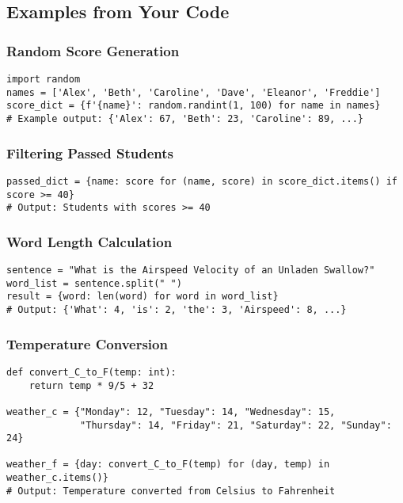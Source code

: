\documentclass[12pt,a4paper]{article}
\begin{document}
\subsection{Examples from Your Code}

\subsubsection{Random Score Generation}
\begin{lstlisting}
import random
names = ['Alex', 'Beth', 'Caroline', 'Dave', 'Eleanor', 'Freddie']
score_dict = {f'{name}': random.randint(1, 100) for name in names}
# Example output: {'Alex': 67, 'Beth': 23, 'Caroline': 89, ...}
\end{lstlisting}

\subsubsection{Filtering Passed Students}
\begin{lstlisting}
passed_dict = {name: score for (name, score) in score_dict.items() if score >= 40}
# Output: Students with scores >= 40
\end{lstlisting}

\subsubsection{Word Length Calculation}
\begin{lstlisting}
sentence = "What is the Airspeed Velocity of an Unladen Swallow?"
word_list = sentence.split(" ")
result = {word: len(word) for word in word_list}
# Output: {'What': 4, 'is': 2, 'the': 3, 'Airspeed': 8, ...}
\end{lstlisting}

\subsubsection{Temperature Conversion}
\begin{lstlisting}
def convert_C_to_F(temp: int):
    return temp * 9/5 + 32

weather_c = {"Monday": 12, "Tuesday": 14, "Wednesday": 15, 
             "Thursday": 14, "Friday": 21, "Saturday": 22, "Sunday": 24}

weather_f = {day: convert_C_to_F(temp) for (day, temp) in weather_c.items()}
# Output: Temperature converted from Celsius to Fahrenheit
\end{lstlisting}
\end{document}
